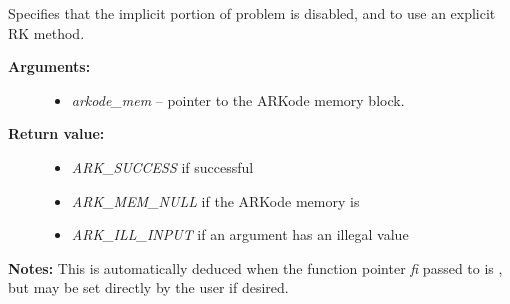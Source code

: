 \documentclass[letterpaper,10pt,english]{sphinxmanual}
\begin{document}
\begin{fulllineitems}
\label{c_interface/User_callable:ARKodeSetExplicit}
Specifies that the implicit portion of problem is disabled,
and to use an explicit RK method.
\begin{description}
\item[{\textbf{Arguments:}}] \leavevmode\begin{itemize}
\item {} 
\emph{arkode\_mem} -- pointer to the ARKode memory block.

\end{itemize}

\item[{\textbf{Return value:}}] \leavevmode\begin{itemize}
\item {} 
\emph{ARK\_SUCCESS} if successful

\item {} 
\emph{ARK\_MEM\_NULL} if the ARKode memory is 

\item {} 
\emph{ARK\_ILL\_INPUT} if an argument has an illegal value

\end{itemize}

\end{description}

\textbf{Notes:} This is automatically deduced when the function pointer \emph{fi}
passed to {\hyperref[c_interface/User_callable:ARKodeInit]{}} is , but may be set
directly by the user if desired.

\end{fulllineitems}

\end{document}
